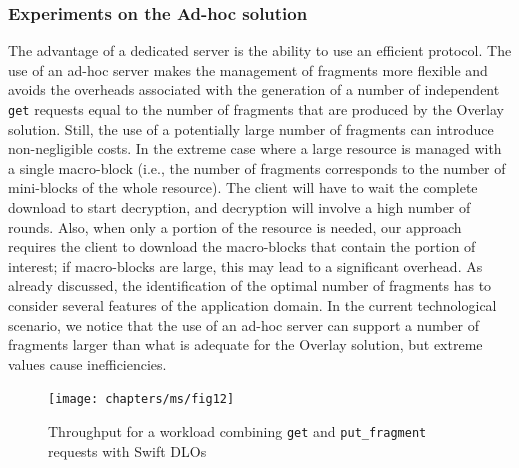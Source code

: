 \subsubsection{Experiments on the Ad-hoc solution}
The advantage of a dedicated server is the ability to use an efficient protocol. The use of an ad-hoc server makes the management of fragments more flexible and avoids the overheads associated with the generation of a number of independent {\tt get} requests equal to the number of fragments that are produced by the Overlay solution. Still, the use of a potentially large number of fragments can introduce non-negligible costs. In the extreme case where a large resource is managed with a single macro-block (i.e., the number of fragments corresponds to the number of mini-blocks of the whole resource). The client will have to wait the complete download to start decryption, and decryption will involve a high number of rounds. Also, when only a portion of the resource is needed, our approach requires the client to download the macro-blocks that contain the portion of interest; if macro-blocks are large, this may lead to a significant overhead. As already discussed, the identification of the optimal number of fragments has to consider several features of the application domain. In the current technological scenario, we notice that the use of an ad-hoc server can support a number of fragments larger than what is adequate for the Overlay solution, but extreme values cause inefficiencies.

\begin{figure}[t]
\texttt{[image: chapters/ms/fig12]}
\caption{\label{ms:fig:throughputDlo}Throughput for a workload combining {\tt get} and {\tt put\_fragment} requests with Swift DLOs}
\end{figure}

